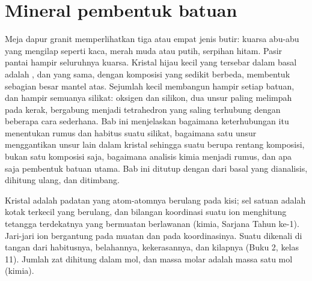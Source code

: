 \chapter{Mineral pembentuk batuan}\label{ch:b1:rock-forming-minerals}

Meja dapur granit memperlihatkan tiga atau empat jenis butir: kuarsa abu-abu yang mengilap seperti kaca,  merah muda atau putih, serpihan  hitam. Pasir pantai hampir seluruhnya kuarsa. Kristal hijau kecil yang tersebar dalam basal adalah , dan  yang sama, dengan komposisi yang sedikit berbeda, membentuk sebagian besar mantel atas. Sejumlah kecil  membangun hampir setiap batuan, dan hampir semuanya silikat: oksigen dan silikon, dua unsur paling melimpah pada kerak, bergabung menjadi tetrahedron yang saling terhubung dengan beberapa cara sederhana. Bab ini menjelaskan bagaimana keterhubungan itu menentukan rumus dan habitus suatu silikat, bagaimana satu unsur menggantikan unsur lain dalam kristal sehingga suatu  berupa rentang komposisi, bukan satu komposisi saja, bagaimana analisis kimia menjadi rumus, dan apa saja  pembentuk batuan utama. Bab ini ditutup dengan  dari basal yang dianalisis, dihitung ulang, dan ditimbang.

\begin{recall}
Kristal adalah padatan yang atom-atomnya berulang pada kisi; sel satuan adalah kotak terkecil yang berulang, dan bilangan koordinasi suatu ion menghitung tetangga terdekatnya yang bermuatan berlawanan (kimia, Sarjana Tahun ke-1). Jari-jari ion bergantung pada muatan dan pada koordinasinya. Suatu  dikenali di tangan dari habitusnya, belahannya, kekerasannya, dan kilapnya (Buku 2, kelas 11). Jumlah zat dihitung dalam mol, dan massa molar adalah massa satu mol (kimia).
\end{recall}


